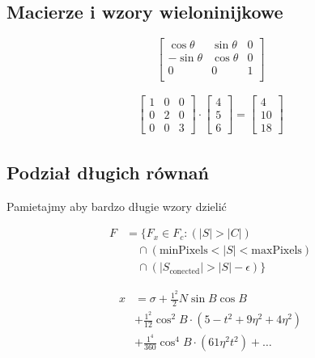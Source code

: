 \subsection{Macierze i wzory wieloninijkowe}

\begin{equation}\label{eq:matrix1}
	\begin{bmatrix}
		\cos{\theta}    & \sin{\theta}   & 0 \\
		-\sin{\theta}   & \cos{\theta}   & 0 \\
		0              &  0             & 1 \\
	\end{bmatrix}
\end{equation}


\begin{align}\label{eq:wzor_macierz}
\begin{bmatrix}
    1 & 0 & 0 \\
    0 & 2 & 0 \\
    0 & 0 & 3
\end{bmatrix} \cdot
\begin{bmatrix}
    4 \\ 5 \\ 6
\end{bmatrix} =
\begin{bmatrix}
    4 \\ 10 \\ 18
\end{bmatrix}
\end{align}

\subsection{Podział długich równań}
Pamietajmy aby bardzo długie wzory dzielić

\begin{equation}
\begin{split}
F 	& = \{F_{x} \in  F_{c} 	: (|S| > |C|) \\
	&\quad \cap (\text{minPixels}  < |S| < \text{maxPixels}) \\
	&\quad \cap (|S_{\text{conected}}| > |S| - \epsilon) \}
\end{split}
\end{equation}
	
\begin{equation}
    \begin{split}
        x   & = \sigma + \frac{1^2}{2} N \sin{B} \cos{B} \\
        & + \frac{1^2}{12} \cos^2{B} \cdot \left( 5 - t^2 + 9 \eta^2 + 4 \eta^2 \right)  \\
        & +\frac{1^4}{360} \cos^4{B} \cdot \left( 61 \eta^2 t^2 \right) + \ldots 
    \end{split}
\end{equation}

